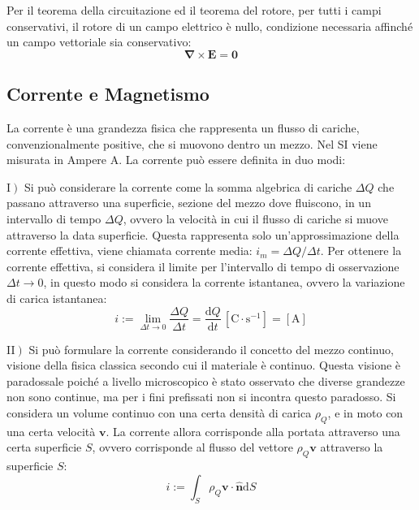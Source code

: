\documentclass{article}
\newcommand{\vect}[1]{\boldsymbol{\mathbf{#1}}}
\newcommand{\df}{\mathrm{d}}
\newcommand{\SI}[1]{\mathrm{#1}}
\numberwithin{equation}{subsection}
\begin{document}
Per il teorema della circuitazione ed il teorema del rotore, per tutti i campi conservativi, il rotore di un campo elettrico è nullo, condizione necessaria affinché un campo 
vettoriale sia conservativo: 
\begin{equation}
    {\vect\nabla}\times\vect{E}=\vect0
\end{equation}

\subsection{Corrente e Magnetismo}

La corrente è una grandezza fisica che rappresenta un flusso di cariche, convenzionalmente positive, che si muovono dentro un mezzo. Nel SI viene misurata in Ampere A. 
La corrente può essere definita in duo modi:  


I$\left.\right)$ Si può considerare la corrente come la somma algebrica di cariche $\Delta Q$ che passano attraverso una superficie, sezione del 
mezzo dove fluiscono, in un intervallo di tempo $\Delta Q$, ovvero la velocità in cui il flusso di cariche si muove attraverso la data superficie. Questa rappresenta solo 
un'approssimazione della corrente effettiva, viene chiamata corrente media: $i_m={\Delta Q}/{\Delta t}$. Per ottenere la corrente effettiva, si considera il 
limite per l'intervallo di tempo di osservazione $\Delta t\to0$, in questo modo si considera la corrente istantanea, ovvero la variazione di carica istantanea:
\begin{equation}
    i:=\lim_{\Delta t\to0}\displaystyle\frac{\Delta Q}{\Delta t}=\frac{\df Q}{\df t}\,[\SI{C}\cdot\SI{s}^{-1}]=[\SI{A}]
\end{equation}  

II$\left.\right)$ Si può formulare la corrente considerando il concetto del mezzo continuo, visione della fisica classica secondo cui il materiale è continuo. Questa visione è paradossale 
poiché a livello microscopico è stato osservato che diverse grandezze non sono continue, ma per i fini prefissati non si incontra questo paradosso. Si considera un volume 
continuo con una certa densità di carica $\rho_Q$, e in moto con una certa velocità $\vect{v}$. La corrente allora corrisponde alla portata attraverso una certa superficie $S$, 
ovvero corrisponde al flusso del vettore $\rho_Q\vect{v}$ attraverso la superficie $S$: 
\begin{equation}
    i:=\displaystyle\int_S\rho_Q\vect{v}\cdot\hat{\vect{n}}\df S
\end{equation}
\end{document}
